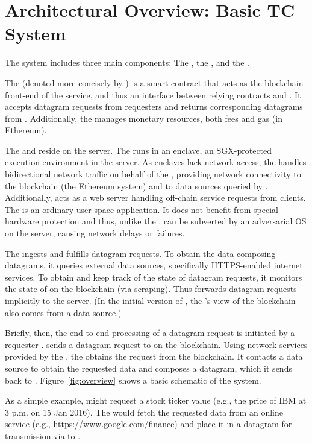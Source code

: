 \section{Architectural Overview: Basic TC System}

The \tcs system includes three main components: The \tcontract, the \encname, and the \medname.

The \tcontract (denoted more concisely by \tcont) is a smart contract that acts as the blockchain front-end of the \tc service, and thus an interface between relying contracts and \tc. It accepts datagram requests from requesters and returns corresponding datagrams from \tc. Additionally, the \tcontract manages \tc monetary resources, both fees and gas (in Ethereum). 

The \encname and \medname reside on the \tc server. The \encname runs in an enclave, an SGX-protected execution environment in the server. As enclaves lack network access, the \medname handles bidirectional network traffic on behalf of the \encname, providing network connectivity to the blockchain (the Ethereum system) and to data sources queried by \encname. Additionally, \medname acts as a web server handling off-chain service requests from clients. The \medname is an ordinary user-space application. It does not benefit from special hardware protection and thus, unlike the \encname, can be subverted by an adversarial OS on the \tc server, causing network delays or failures.

The \encname ingests and fulfills datagram requests. To obtain the data composing datagrams, it queries external data sources, specifically HTTPS-enabled internet services. To obtain and keep track of the state of datagram requests, it monitors the state of \tcontract on the blockchain (via scraping). Thus \tcontract forwards datagram requests implicitly to the \tc server. (In the initial version of \tcontract, the \encname's view of the blockchain also comes from a data source.) 

Briefly, then, the end-to-end processing of a datagram request is initiated by a requester \reqcont. \reqcont sends a datagram request to \tcont on the blockchain. Using network services provided by the \medname, the \encname obtains the request from the blockchain. It contacts a data source to obtain the requested data and composes a datagram, which it sends back to \reqcont. Figure~\ref{fig:overview} shows a basic schematic of the \tc system.

As a simple example, \reqcont might request a stock ticker value (e.g., the price of IBM at 3 p.m. on 15 Jan 2016). The \encname would fetch the requested data from an online service (e.g., https://www.google.com/finance) and place it in a datagram for transmission via \tcont to \reqcont.

